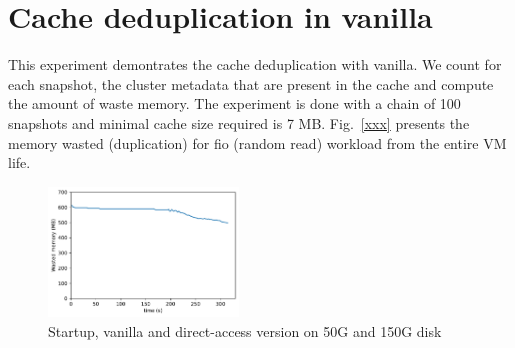 \documentclass[sigplan,screen,10pt]{acmart}
\begin{document}
	\section*{Cache deduplication in vanilla}
	This experiment demontrates the cache deduplication with vanilla.
	We count for each snapshot, the cluster metadata that are present in the cache and compute the amount of waste memory. 
	The experiment is done with a chain of 100 snapshots and minimal cache size required is 7 MB.
	Fig.~\ref{xxx} presents the memory wasted (duplication) for fio (random read) workload from the entire VM life.
	
	\begin{figure}[h]
		\center
		\includegraphics[width=0.45\textwidth]{dupli_memory.pdf}
		\caption{Startup, vanilla and direct-access version on 50G and 150G disk}
		\label{fig:fig-d}
	\end{figure}
\end{document}
